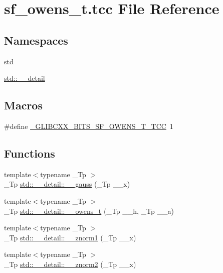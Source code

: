 \hypertarget{sf__owens__t_8tcc}{}\section{sf\+\_\+owens\+\_\+t.\+tcc File Reference}
\label{sf__owens__t_8tcc}
\subsection*{Namespaces}
\begin{DoxyCompactItemize}
\item 
 \hyperlink{namespacestd}{std}
\item 
 \hyperlink{namespacestd_1_1____detail}{std\+::\+\_\+\+\_\+detail}
\end{DoxyCompactItemize}
\subsection*{Macros}
\begin{DoxyCompactItemize}
\item 
\#define \hyperlink{sf__owens__t_8tcc_a5986cbb2c459a5e859ffe2fe1fa7cd25}{\+\_\+\+G\+L\+I\+B\+C\+X\+X\+\_\+\+B\+I\+T\+S\+\_\+\+S\+F\+\_\+\+O\+W\+E\+N\+S\+\_\+\+T\+\_\+\+T\+C\+C}~1
\end{DoxyCompactItemize}
\subsection*{Functions}
\begin{DoxyCompactItemize}
\item 
{\footnotesize template$<$typename \+\_\+\+Tp $>$ }\\\+\_\+\+Tp \hyperlink{namespacestd_1_1____detail_afdb25beb2328b74d64d9be03de64c442}{std\+::\+\_\+\+\_\+detail\+::\+\_\+\+\_\+gauss} (\+\_\+\+Tp \+\_\+\+\_\+x)
\item 
{\footnotesize template$<$typename \+\_\+\+Tp $>$ }\\\+\_\+\+Tp \hyperlink{namespacestd_1_1____detail_a5b50a9d8beaca5a637c8293ab01bf124}{std\+::\+\_\+\+\_\+detail\+::\+\_\+\+\_\+owens\+\_\+t} (\+\_\+\+Tp \+\_\+\+\_\+h, \+\_\+\+Tp \+\_\+\+\_\+a)
\item 
{\footnotesize template$<$typename \+\_\+\+Tp $>$ }\\\+\_\+\+Tp \hyperlink{namespacestd_1_1____detail_a6827b123253cc6a19947406339738bd7}{std\+::\+\_\+\+\_\+detail\+::\+\_\+\+\_\+znorm1} (\+\_\+\+Tp \+\_\+\+\_\+x)
\item 
{\footnotesize template$<$typename \+\_\+\+Tp $>$ }\\\+\_\+\+Tp \hyperlink{namespacestd_1_1____detail_adf930b70ca943c6810ac7d2ea78d2cc3}{std\+::\+\_\+\+\_\+detail\+::\+\_\+\+\_\+znorm2} (\+\_\+\+Tp \+\_\+\+\_\+x)
\end{DoxyCompactItemize}


